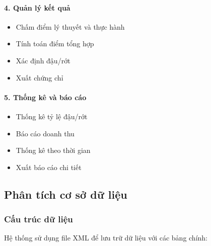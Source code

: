 \documentclass[12pt,a4paper]{article}
\begin{document}
\paragraph{4. Quản lý kết quả}
\begin{itemize}
    \item Chấm điểm lý thuyết và thực hành
    \item Tính toán điểm tổng hợp
    \item Xác định đậu/rớt
    \item Xuất chứng chỉ
\end{itemize}

\paragraph{5. Thống kê và báo cáo}
\begin{itemize}
    \item Thống kê tỷ lệ đậu/rớt
    \item Báo cáo doanh thu
    \item Thống kê theo thời gian
    \item Xuất báo cáo chi tiết
\end{itemize}

\subsection{Phân tích cơ sở dữ liệu}

\subsubsection{Cấu trúc dữ liệu}

Hệ thống sử dụng file XML để lưu trữ dữ liệu với các bảng chính:
\end{document}
